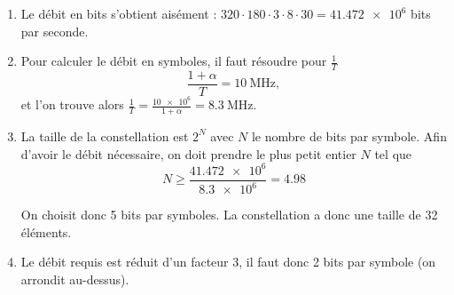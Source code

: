 \documentclass [a4paper, 11pt] {article}
\begin{document}
        
    \begin{reponse}
        \begin{enumerate}
            \item Le débit en bits s'obtient aisément : $320\cdot180\cdot3\cdot8\cdot30= \num{41.472e6}$ bits par seconde.
            \item Pour calculer le débit en symboles, il faut résoudre pour $\frac{1}{T}$
            \begin{equation}
                \frac{1+\alpha}{T} = \SI{10}{\mega\hertz},
            \end{equation}
            et l'on trouve alors $\frac{1}{T} = \frac{\num{10e6}}{1 + \alpha}= \SI{8.3}{\mega\hertz}$.
            \item La taille de la constellation est $2^N$ avec $N$ le nombre de bits par symbole. Afin d'avoir le débit nécessaire, on doit prendre le plus petit entier $N$ tel que
            \begin{equation}
                N \ge \frac{\num{41.472e6}}{\num{8.3e6}} = 4.98
            \end{equation}
            
            On choisit donc 5 bits par symboles. La constellation a donc une taille de 32 éléments.
            \item Le débit requis est réduit d'un facteur 3, il faut donc 2 bits par symbole (on arrondit au-dessus).
        \end{enumerate}
    \end{reponse}
\end{document}
